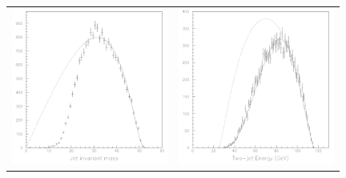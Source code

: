 \documentclass[12pt]{article}
\begin{document}
\begin{figure}[t]
  \begin{center}
    \begin{tabular}{p{0.49\linewidth} p{0.49\linewidth}}
      \begin{minipage}{\linewidth} \includegraphics[width=\linewidth]{jimpcharginoanal_a} \end{minipage} &
      \begin{minipage}{\linewidth} \includegraphics[width=\linewidth]{jimp_jetenergyfit} \end{minipage}

\end{tabular}
\end{center}
\end{figure}
\end{document}
